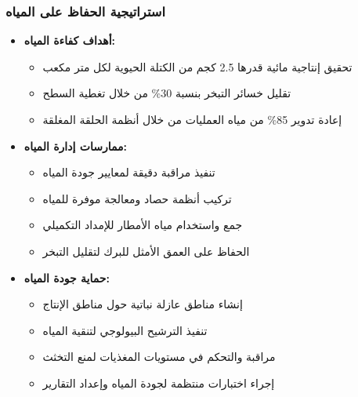 \subsubsection{استراتيجية الحفاظ على المياه}
\begin{itemize}
    \item \textbf{أهداف كفاءة المياه:}
    \begin{itemize}
        \item تحقيق إنتاجية مائية قدرها 2.5 كجم من الكتلة الحيوية لكل متر مكعب
        \item تقليل خسائر التبخر بنسبة 30\% من خلال تغطية السطح
        \item إعادة تدوير 85\% من مياه العمليات من خلال أنظمة الحلقة المغلقة
    \end{itemize}
    
    \item \textbf{ممارسات إدارة المياه:}
    \begin{itemize}
        \item تنفيذ مراقبة دقيقة لمعايير جودة المياه
        \item تركيب أنظمة حصاد ومعالجة موفرة للمياه
        \item جمع واستخدام مياه الأمطار للإمداد التكميلي
        \item الحفاظ على العمق الأمثل للبرك لتقليل التبخر
    \end{itemize}
    
    \item \textbf{حماية جودة المياه:}
    \begin{itemize}
        \item إنشاء مناطق عازلة نباتية حول مناطق الإنتاج
        \item تنفيذ الترشيح البيولوجي لتنقية المياه
        \item مراقبة والتحكم في مستويات المغذيات لمنع التخثث
        \item إجراء اختبارات منتظمة لجودة المياه وإعداد التقارير
    \end{itemize}
\end{itemize}

